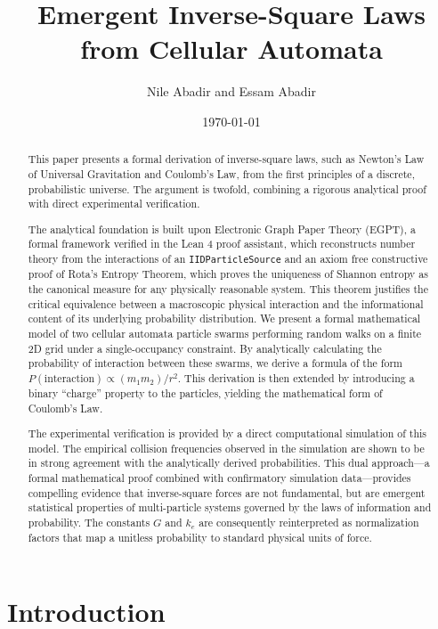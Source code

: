 \documentclass[11pt, letterpaper]{article}
\title{Emergent Inverse-Square Laws from Cellular Automata}
\author{Nile Abadir and Essam Abadir}
\date{\today}
\begin{document}
\maketitle

\begin{abstract}
This paper presents a formal derivation of inverse-square laws, such as Newton's Law of Universal Gravitation and Coulomb's Law, from the first principles of a discrete, probabilistic universe. The argument is twofold, combining a rigorous analytical proof with direct experimental verification.

The analytical foundation is built upon Electronic Graph Paper Theory (EGPT), a formal framework verified in the Lean 4 proof assistant, which reconstructs number theory from the interactions of an \texttt{IIDParticleSource} and an axiom free constructive proof of Rota's Entropy Theorem, which proves the uniqueness of Shannon entropy as the canonical measure for any physically reasonable system. This theorem justifies the critical equivalence between a macroscopic physical interaction and the informational content of its underlying probability distribution. We present a formal mathematical model of two cellular automata particle swarms performing random walks on a finite 2D grid under a single-occupancy constraint. By analytically calculating the probability of interaction between these swarms, we derive a formula of the form $P(\text{interaction}) \propto (m_1 m_2)/r^2$. This derivation is then extended by introducing a binary ``charge'' property to the particles, yielding the mathematical form of Coulomb's Law.

The experimental verification is provided by a direct computational simulation of this model. The empirical collision frequencies observed in the simulation are shown to be in strong agreement with the analytically derived probabilities. This dual approach---a formal mathematical proof combined with confirmatory simulation data---provides compelling evidence that inverse-square forces are not fundamental, but are emergent statistical properties of multi-particle systems governed by the laws of information and probability. The constants $G$ and $k_e$ are consequently reinterpreted as normalization factors that map a unitless probability to standard physical units of force.
\end{abstract}


\section{Introduction}
\end{document}
